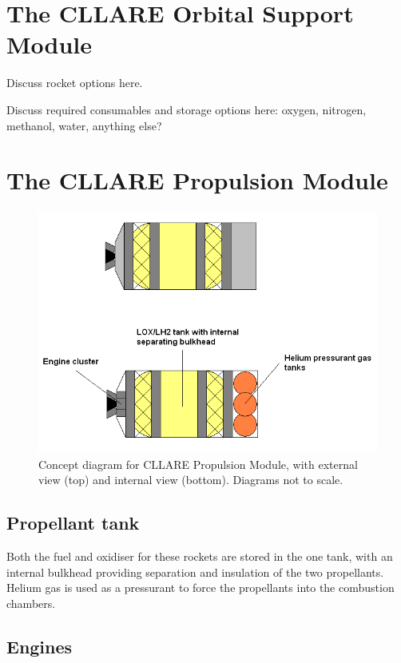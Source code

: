 \documentclass{report}
\begin{document}
\section{The CLLARE Orbital Support Module}

Discuss rocket options here.

Discuss required consumables and storage options here: oxygen, nitrogen, methanol, water, anything else?


\section{The CLLARE Propulsion Module}

\begin{figure}[h] \label{fig:pm}
\centering
\includegraphics[scale=0.6]{images/cllare_pm_concept}
\caption{Concept diagram for CLLARE Propulsion Module, with external view (top) and internal view (bottom).  Diagrams not to scale.}
\end{figure}

\subsection{Propellant tank}

Both the fuel and oxidiser for these rockets are stored in the one tank, with an internal bulkhead providing separation and insulation of the two propellants.  Helium gas is used as a pressurant to force the propellants into the combustion chambers.

\subsection{Engines}
\end{document}
